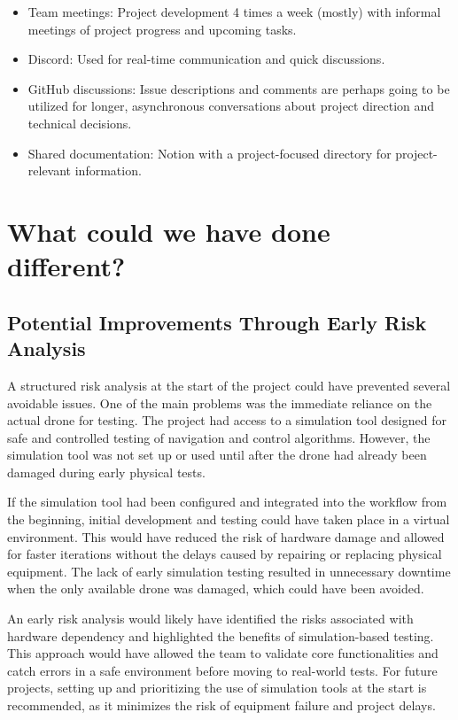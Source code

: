\begin{itemize}
    \item Team meetings: Project development 4 times a week (mostly) with informal meetings of project progress and upcoming tasks.
    \item Discord: Used for real-time communication and quick discussions.
    \item GitHub discussions: Issue descriptions and comments are perhaps going to be utilized for longer, asynchronous conversations about project direction and technical decisions.
    \item Shared documentation: Notion with a project-focused directory for project-relevant information.
\end{itemize}

\section{What could we have done different?}

\subsection{Potential Improvements Through Early Risk Analysis}

A structured risk analysis at the start of the project could have prevented several avoidable issues. One of the main problems was the immediate reliance on the actual drone for testing. The project had access to a simulation tool designed for safe and controlled testing of navigation and control algorithms. However, the simulation tool was not set up or used until after the drone had already been damaged during early physical tests.

If the simulation tool had been configured and integrated into the workflow from the beginning, initial development and testing could have taken place in a virtual environment. This would have reduced the risk of hardware damage and allowed for faster iterations without the delays caused by repairing or replacing physical equipment. The lack of early simulation testing resulted in unnecessary downtime when the only available drone was damaged, which could have been avoided.

An early risk analysis would likely have identified the risks associated with hardware dependency and highlighted the benefits of simulation-based testing. This approach would have allowed the team to validate core functionalities and catch errors in a safe environment before moving to real-world tests. For future projects, setting up and prioritizing the use of simulation tools at the start is recommended, as it minimizes the risk of equipment failure and project delays.

